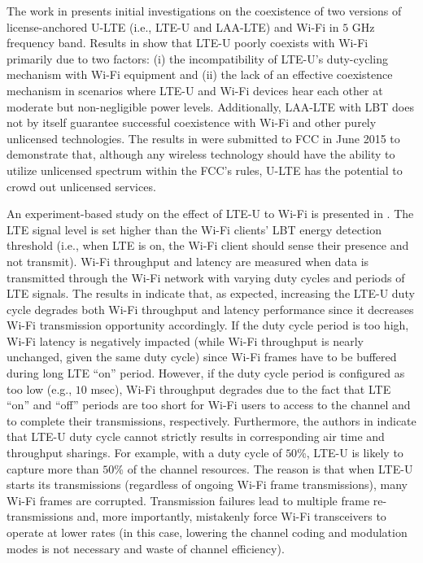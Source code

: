 The work in \cite{U-LTE-Google-WP} presents initial investigations on the coexistence of two versions of license-anchored U-LTE (i.e., LTE-U and LAA-LTE) and Wi-Fi in $5$ GHz frequency band. Results in \cite{U-LTE-Google-WP} show that LTE-U poorly coexists with Wi-Fi primarily due to two factors: (i) the incompatibility of LTE-U's duty-cycling mechanism with Wi-Fi equipment and (ii) the lack of an effective coexistence mechanism in scenarios where LTE-U and Wi-Fi devices hear each other at moderate but non-negligible power levels. Additionally, LAA-LTE with LBT does not by itself guarantee successful coexistence with Wi-Fi and other purely unlicensed technologies. The results in \cite{U-LTE-Google-WP} were submitted to FCC in June 2015 to demonstrate that, although any wireless technology should have the ability to utilize unlicensed spectrum within the FCC's rules, U-LTE has the potential to crowd out unlicensed services.

An experiment-based study on the effect of LTE-U to Wi-Fi is presented in \cite{LTE-U-CableLabs}. The LTE signal level is set higher than the Wi-Fi clients' LBT energy detection threshold (i.e., when LTE is on, the Wi-Fi client should sense their presence and not transmit). Wi-Fi throughput and latency are measured when data is transmitted through the Wi-Fi network with varying duty cycles and periods of LTE signals. The results in \cite{LTE-U-CableLabs} indicate that, as expected, increasing the LTE-U duty cycle degrades both Wi-Fi throughput and latency performance since it decreases Wi-Fi transmission opportunity accordingly. If the duty cycle period is too high, Wi-Fi latency is negatively impacted (while Wi-Fi throughput is nearly unchanged, given the same duty cycle) since Wi-Fi frames have to be buffered during long LTE ``on'' period. However, if the duty cycle period is configured as too low (e.g., $10$ msec), Wi-Fi throughput degrades due to the fact that LTE ``on'' and ``off'' periods are too short for Wi-Fi users to access to the channel and to complete their transmissions, respectively. Furthermore, the authors in \cite{LTE-U-CableLabs} indicate that LTE-U duty cycle cannot strictly results in corresponding air time and throughput sharings. For example, with a duty cycle of $50$\%, LTE-U is likely to capture more than $50$\% of the channel resources. The reason is that when LTE-U starts its transmissions (regardless of ongoing Wi-Fi frame transmissions), many Wi-Fi frames are corrupted. Transmission failures lead to multiple frame re-transmissions and, more importantly, mistakenly force Wi-Fi transceivers to operate at lower rates (in this case, lowering the channel coding and modulation modes is not necessary and waste of channel efficiency).


